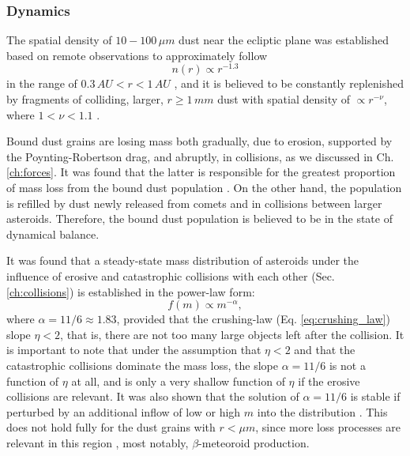 \subsubsection{Dynamics}

The spatial density of $10 - 100 \, \si{\mu m}$ dust near the ecliptic plane was established based on remote observations to approximately follow 
\begin{equation}
    n(r) \propto r^{-1.3}
\end{equation}
in the range of $0.3 \, \si{AU} < r < 1 \, \si{AU}$ \citep{leinert1981zodiacal}, and it is believed to be constantly replenished by fragments of colliding, larger, $r \geq 1 \, \si{mm}$ dust with spatial density of $\propto r^{-\nu}$, where $1 < \nu < 1.1$ \citep{leinert1983maintain}.

Bound dust grains are losing mass both gradually, due to erosion, supported by the Poynting-Robertson drag, and abruptly, in collisions, as we discussed in Ch. \ref{ch:forces}. It was found that the latter is responsible for the greatest proportion of mass loss from the bound dust population \citep{grun1985collisional}. On the other hand, the population is refilled by dust newly released from comets and in collisions between larger asteroids. Therefore, the bound dust population is believed to be in the state of dynamical balance. 

It was found \citep{dohnanyi1969collisional} that a steady-state mass distribution of asteroids under the influence of erosive and catastrophic collisions with each other (Sec. \ref{ch:collisions}) is established in the power-law form:
\begin{equation}
    f(m) \propto m^{-\alpha},
\end{equation}
where $\alpha = 11/6 \approx 1.83$, provided that the crushing-law (Eq. \ref{eq:crushing_law}) slope $\eta < 2$, that is, there are not too many large objects left after the collision. It is important to note that under the assumption that $\eta < 2$ and that the catastrophic collisions dominate the mass loss, the slope $\alpha = 11/6$ is not a function of $\eta$ at all, and is only a very shallow function of $\eta$ if the erosive collisions are relevant. It was also shown that the solution of $\alpha = 11/6$ is stable if perturbed by an additional inflow of low or high $m$ into the distribution \citep{dohnanyi1969collisional}. This does not hold fully for the dust grains with $r < \si{\mu m}$, since more loss processes are relevant in this region \citep{grun1985collisional}, most notably, $\beta$-meteoroid production.

